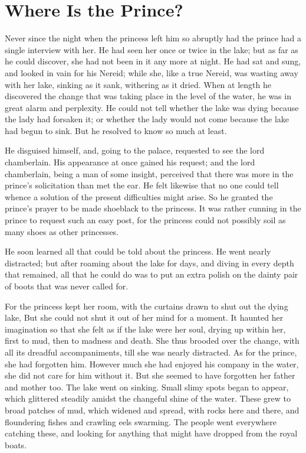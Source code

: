 \documentclass[12pt]{memoir}
\begin{document}
\chapter{Where Is the Prince?}


Never since the night when the princess left him so abruptly had the
prince had a single interview with her.  He had seen her once or twice
in the lake; but as far as he could discover, she had not been in it
any more at night.  He had sat and sung, and looked in vain for his
Nereid; while she, like a true Nereid, was wasting away with her lake,
sinking as it sank, withering as it dried.  When at length he
discovered the change that was taking place in the level of the water,
he was in great alarm and perplexity.  He could not tell whether the
lake was dying because the lady had forsaken it; or whether the lady
would not come because the lake had begun to sink.  But he resolved to
know so much at least.

He disguised himself, and, going to the palace, requested to see the
lord chamberlain.  His appearance at once gained his request; and the
lord chamberlain, being a man of some insight, perceived that there
was more in the prince's solicitation than met the ear.  He felt
likewise that no one could tell whence a solution of the present
difficulties might arise.  So he granted the prince's prayer to be
made shoeblack to the princess.  It was rather cunning in the prince
to request such an easy post, for the princess could not possibly soil
as many shoes as other princesses.

He soon learned all that could be told about the princess.  He went
nearly distracted; but after roaming about the lake for days, and
diving in every depth that remained, all that he could do was to put
an extra polish on the dainty pair of boots that was never called for.

For the princess kept her room, with the curtains drawn to shut out
the dying lake, But she could not shut it out of her mind for a
moment.  It haunted her imagination so that she felt as if the lake
were her soul, drying up within her, first to mud, then to madness and
death.  She thus brooded over the change, with all its dreadful
accompaniments, till she was nearly distracted.  As for the prince,
she had forgotten him.  However much she had enjoyed his company in
the water, she did not care for him without it.  But she seemed to
have forgotten her father and mother too.  The lake went on sinking.
Small slimy spots began to appear, which glittered steadily amidst the
changeful shine of the water.  These grew to broad patches of mud,
which widened and spread, with rocks here and there, and floundering
fishes and crawling eels swarming.  The people went everywhere
catching these, and looking for anything that might have dropped from
the royal boats.
\end{document}
